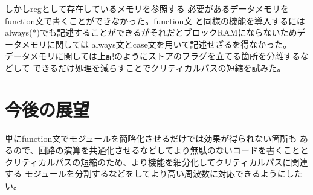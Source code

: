 \documentclass[12pt]{jreport}
\begin{document}
  
  しかしregとして存在しているメモリを参照する
  必要があるデータメモリをfunction文で書くことができなかった。function文
  と同様の機能を導入するにはalways(*)でも記述することができるがそれだとブロックRAMにならないためデータメモリに関しては
  always文とcase文を用いて記述せざるを得なかった。\\
  データメモリに関しては上記のようにストアのフラグを立てる箇所を分離するなどして
  できるだけ処理を減らすことでクリティカルパスの短縮を試みた。
  
  
  \part{今後の展望}
  単にfunction文でモジュールを簡略化させるだけでは効果が得られない箇所も
  あるので、回路の演算を共通化させるなどしてより無駄のないコードを書くことと
  クリティカルパスの短縮のため、より機能を細分化してクリティカルパスに関連する
  モジュールを分割するなどをしてより高い周波数に対応できるようにしたい。

  




 

  
  
\end{document}
